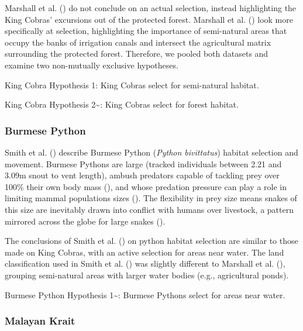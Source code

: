 \documentclass[10pt,a4paper]{article}
\begin{document}
Marshall et al. () do not conclude on an actual selection, instead highlighting the King Cobras' excursions out of the protected forest.
Marshall et al. () look more specifically at selection, highlighting the importance of semi-natural areas that occupy the banks of irrigation canals and intersect the agricultural matrix surrounding the protected forest.
Therefore, we pooled both datasets and examine two non-mutually exclusive hypotheses.

King Cobra Hypothesis 1: King Cobras select for semi-natural habitat.

King Cobra Hypothesis 2\textasciitilde: King Cobras select for forest habitat.

\subsubsection{Burmese Python}\label{burmese-python}

Smith et al. () describe Burmese Python (\emph{Python bivittatus}) habitat selection and movement.
Burmese Pythons are large (tracked individuals between 2.21 and 3.09m snout to vent length), ambush predators capable of tackling prey over 100\% their own body mass (), and whose predation pressure can play a role in limiting mammal populations sizes ().
The flexibility in prey size means snakes of this size are inevitably drawn into conflict with humans over livestock, a pattern mirrored across the globe for large snakes ().

The conclusions of Smith et al. () on python habitat selection are similar to those made on King Cobras, with an active selection for areas near water.
The land classification used in Smith et al. () was slightly different to Marshall et al. (), grouping semi-natural areas with larger water bodies (e.g., agricultural ponds).

Burmese Python Hypothesis 1\textasciitilde: Burmese Pythons select for areas near water.

\subsubsection{Malayan Krait}\label{malayan-krait}
\end{document}
